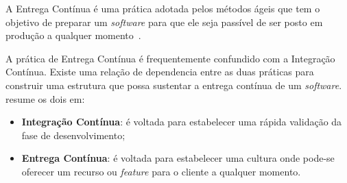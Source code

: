 A Entrega Contínua é uma prática adotada pelos métodos ágeis que tem o objetivo
de preparar um \textit{software} para que ele seja passível de ser posto em produção a
qualquer momento~\cite{olausson:2016}. 

A prática de Entrega Contínua  é frequentemente confundido com a Integração
Contínua. Existe uma relação de dependencia entre as duas práticas para
construir uma estrutura que possa sustentar a entrega contínua de um
\textit{software}.~ resume os dois em:

\begin{itemize}
  \item \textbf{Integração Contínua}: é voltada para estabelecer uma rápida
    validação da fase de desenvolvimento;
  \item \textbf{Entrega Contínua}: é voltada para estabelecer uma cultura onde
    pode-se oferecer um recurso ou \textit{feature} para o cliente a qualquer
    momento.
\end{itemize}

